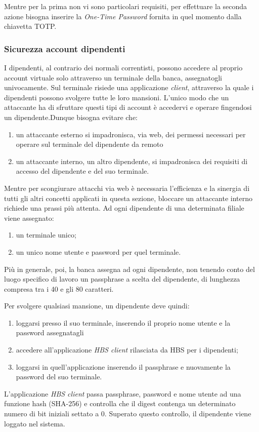 Mentre per la prima non vi sono particolari requisiti, per effettuare la seconda azione bisogna inserire la \emph{One-Time Password} fornita in quel momento dalla chiavetta TOTP.



	\subsubsection{Sicurezza account dipendenti}
I dipendenti, al contrario dei normali correntisti, possono accedere al proprio account virtuale solo attraverso un terminale  della banca, assegnatogli univocamente. Sul terminale risiede una applicazione \emph{client}, attraverso la quale i dipendenti possono svolgere tutte le loro mansioni. L'unico modo che un attaccante ha di sfruttare questi tipi di account è accedervi e operare fingendosi un dipendente.Dunque bisogna evitare che:
\begin{enumerate}
\item un attaccante esterno si impadronisca, via web, dei permessi necessari per operare sul terminale del dipendente da remoto
\item un attaccante interno, un altro dipendente, si impadronisca dei requisiti di accesso del dipendente e del suo terminale.
\end{enumerate}

Mentre per scongiurare attacchi via web è necessaria l'efficienza e la sinergia di tutti gli altri concetti applicati in questa sezione, bloccare un attaccante interno richiede una prassi più attenta.
Ad ogni dipendente di una determinata filiale viene assegnato:
\begin{enumerate}
\item un terminale unico;
\item un unico nome utente e password per quel terminale.
\end{enumerate}
Più in generale, poi, la banca assegna ad ogni dipendente, non tenendo conto del luogo specifico di lavoro un passphrase a scelta del dipendente, di lunghezza compresa tra i 40 e gli 80 caratteri.


Per svolgere qualsiasi mansione, un dipendente deve quindi:
\begin{enumerate}
\item loggarsi presso il suo terminale, inserendo il proprio nome utente e la password assegnatagli
\item accedere all'applicazione \emph{HBS client} rilasciata da HBS per i dipendenti;
\item loggarsi in quell'applicazione inserendo il passphrase e nuovamente la password del suo terminale.
\end{enumerate}
L'applicazione \emph{HBS client} passa passphrase, password e nome utente ad una funzione hash (SHA-256) e controlla che il digest contenga un determinato numero di bit iniziali settato a 0. Superato questo controllo, il dipendente viene loggato nel sistema.

